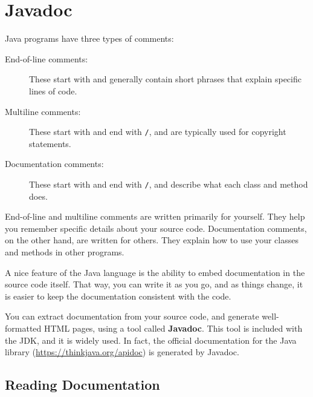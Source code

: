 \chapter{Javadoc}
\label{javadoc}


Java programs have three types of comments:

\begin{description}

\item[End-of-line comments:]
These start with \java{//} and generally contain short phrases that explain specific lines of code.


\item[Multiline comments:]
These start with \java{/*} and end with \textcolor{comment}{\tt */}, and are typically used for copyright statements.

\item[Documentation comments:]
These start with \java{/**} and end with \textcolor{comment}{\tt */}, and describe what each class and method does.

\end{description}

End-of-line and multiline comments are written primarily for yourself.
They help you remember specific details about your source code.
Documentation comments, on the other hand, are written for others.
They explain how to use your classes and methods in other programs.


A nice feature of the Java language is the ability to embed documentation in the source code itself.
That way, you can write it as you go, and as things change, it is easier to keep the documentation consistent with the code.


You can extract documentation from your source code, and generate well-formatted HTML pages, using a tool called {\bf Javadoc}.
This tool is included with the JDK, and it is widely used.
In fact, the official documentation for the Java library (\url{https://thinkjava.org/apidoc}) is generated by Javadoc.


\section{Reading Documentation}

